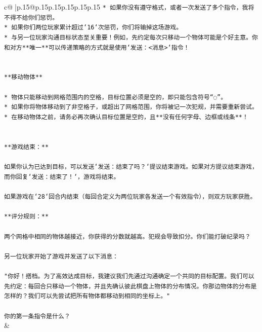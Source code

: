 \documentclass{article}
\begin{document}
{\begin{supertabular}{c@{$\;$}|p{.15\linewidth}@{}p{.15\linewidth}p{.15\linewidth}p{.15\linewidth}p{.15\linewidth}p{.15\linewidth}}
{{{\texttt{* 如果你没有遵守格式，或者一次发送了多个指令，我将不得不给你们惩罚。} \\
\texttt{* 如果你们两位玩家累计超过`16`次惩罚，你们将输掉这场游戏。} \\
\texttt{* 与另一位玩家沟通目标状态至关重要！例如，先约定每次只移动一个物体可能是个好主意。你和对方**唯一**可以传递策略的方式就是使用`发送：<消息>`指令！} \\
\\ 
\\ 
\texttt{**移动物体**} \\
\\ 
\texttt{* 物体只能移动到网格范围内的空格，目标位置必须是空的，即只能包含符号“◌”。} \\
\texttt{* 如果你将物体移动到了非空格子，或超出了网格范围，你将被记一次犯规，并需要重新尝试。} \\
\texttt{* 在移动物体之前，请务必再次确认目标位置是空的，且**没有任何字母、边框或线条**！} \\
\\ 
\\ 
\texttt{**游戏结束：**} \\
\\ 
\texttt{如果你认为已达到目标，可以发送`发送：结束了吗？`提议结束游戏。如果对方提议结束游戏，而你回复`发送：结束了！`，游戏将结束。} \\
\\ 
\texttt{如果游戏在`28`回合内结束（每回合定义为两位玩家各发送一个有效指令），则双方玩家获胜。} \\
\\ 
\texttt{**评分规则：**} \\
\\ 
\texttt{两个网格中相同的物体越接近，你获得的分数就越高。犯规会导致扣分。你们能打破纪录吗？} \\
\\ 
\texttt{另一位玩家开始了游戏并发送了以下消息：} \\
\\ 
\texttt{"你好！搭档。为了高效达成目标，我建议我们先通过沟通确定一个共同的目标配置。我们可以先约定：每回合只移动一个物体，并且先确认彼此棋盘上物体的分布情况。你那边物体的分布是怎样的？我们可以先尝试把所有物体都移动到相同的坐标上。"} \\
\\ 
\texttt{你的第一条指令是什么？} \\
            }
        }
    }
    & \\ \\


\end{supertabular}}
\end{document}
